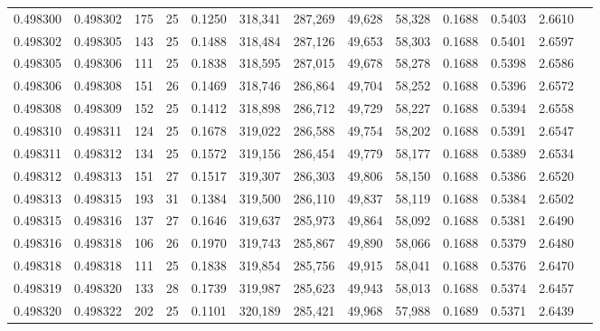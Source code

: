 \begin{tabular}{rrrrrrrrrrrrr}
0.498300 & 0.498302 & 175 &  25 &                                     0.1250 & 318,341 & 287,269 &  49,628 &  58,328 & 0.1688 & 0.5403 & 2.6610 \\
0.498302 & 0.498305 & 143 &  25 &                                     0.1488 & 318,484 & 287,126 &  49,653 &  58,303 & 0.1688 & 0.5401 & 2.6597 \\
0.498305 & 0.498306 & 111 &  25 &                                     0.1838 & 318,595 & 287,015 &  49,678 &  58,278 & 0.1688 & 0.5398 & 2.6586 \\
0.498306 & 0.498308 & 151 &  26 &                                     0.1469 & 318,746 & 286,864 &  49,704 &  58,252 & 0.1688 & 0.5396 & 2.6572 \\
0.498308 & 0.498309 & 152 &  25 &                                     0.1412 & 318,898 & 286,712 &  49,729 &  58,227 & 0.1688 & 0.5394 & 2.6558 \\
0.498310 & 0.498311 & 124 &  25 &                                     0.1678 & 319,022 & 286,588 &  49,754 &  58,202 & 0.1688 & 0.5391 & 2.6547 \\
0.498311 & 0.498312 & 134 &  25 &                                     0.1572 & 319,156 & 286,454 &  49,779 &  58,177 & 0.1688 & 0.5389 & 2.6534 \\
0.498312 & 0.498313 & 151 &  27 &                                     0.1517 & 319,307 & 286,303 &  49,806 &  58,150 & 0.1688 & 0.5386 & 2.6520 \\
0.498313 & 0.498315 & 193 &  31 &                                     0.1384 & 319,500 & 286,110 &  49,837 &  58,119 & 0.1688 & 0.5384 & 2.6502 \\
0.498315 & 0.498316 & 137 &  27 &                                     0.1646 & 319,637 & 285,973 &  49,864 &  58,092 & 0.1688 & 0.5381 & 2.6490 \\
0.498316 & 0.498318 & 106 &  26 &                                     0.1970 & 319,743 & 285,867 &  49,890 &  58,066 & 0.1688 & 0.5379 & 2.6480 \\
0.498318 & 0.498318 & 111 &  25 &                                     0.1838 & 319,854 & 285,756 &  49,915 &  58,041 & 0.1688 & 0.5376 & 2.6470 \\
0.498319 & 0.498320 & 133 &  28 &                                     0.1739 & 319,987 & 285,623 &  49,943 &  58,013 & 0.1688 & 0.5374 & 2.6457 \\
0.498320 & 0.498322 & 202 &  25 &                                     0.1101 & 320,189 & 285,421 &  49,968 &  57,988 & 0.1689 & 0.5371 & 2.6439 \\

\end{tabular}
